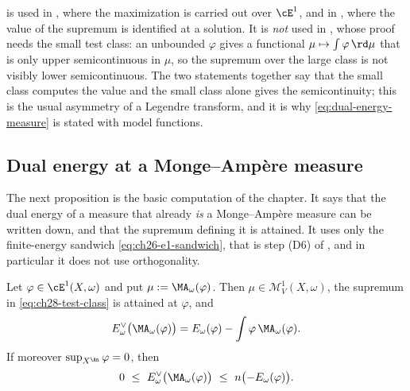 \begin{remark}
\label{rem:ch28-test-class-use}
 is used in
, where the maximization is carried out
over \(\cE^1\), and in
, where the value of
the supremum is identified at a solution.  It is \emph{not} used in
, whose proof needs the small test class:
an unbounded \(\varphi\) gives a functional \(\mu\mapsto\int\varphi\,\rd\mu\)
that is only upper semicontinuous in \(\mu\), so the supremum over the large
class is not visibly lower semicontinuous.  The two statements together say
that the small class computes the value and the small class alone gives the
semicontinuity; this is the usual asymmetry of a Legendre transform, and it
is why \eqref{eq:dual-energy-measure} is stated with model functions.
\end{remark}

\subsection{Dual energy at a Monge--Amp\`ere measure}
\label{sec:ch28-dual-at-ma}

The next proposition is the basic computation of the chapter.  It says that
the dual energy of a measure that already \emph{is} a Monge--Amp\`ere
measure can be written down, and that the supremum defining it is attained.
It uses only the finite-energy sandwich \eqref{eq:ch26-e1-sandwich}, that is
step \textup{(D6)} of , and in particular it does
not use orthogonality.

\begin{proposition}
\label{prop:ch28-dual-energy-of-ma}
Let \(\varphi\in\cE^1(X,\omega)\) and put \(\mu:=\MA_\omega(\varphi)\).  Then
\(\mu\in\mathcal M^1_V(X,\omega)\), the supremum in
\eqref{eq:ch28-test-class} is attained at \(\varphi\), and
\begin{equation}
\label{eq:ch28-dual-energy-of-ma}
 E^\vee_\omega\bigl(\MA_\omega(\varphi)\bigr)
 =E_\omega(\varphi)-\int\varphi\,\MA_\omega(\varphi).
\end{equation}
If moreover \(\sup_{X^{\An}}\varphi=0\), then
\begin{equation}
\label{eq:ch28-dual-energy-bracket}
 0\ \leq\ E^\vee_\omega\bigl(\MA_\omega(\varphi)\bigr)
 \ \leq\ n\bigl(-E_\omega(\varphi)\bigr).
\end{equation}
\end{proposition}

